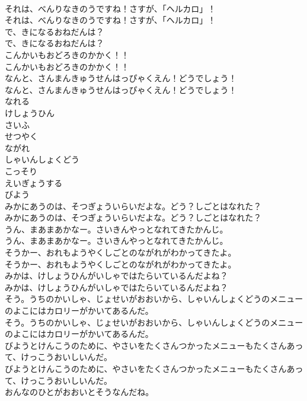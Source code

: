 \documentclass[8pt]{extreport}
\begin{document}
\begin{CJK}{UTF8}{min}
\\	それは、べんりなきのうですね！さすが、「ヘルカロ」！
\\	それは、べんりなきのうですね！さすが、「ヘルカロ」！
\\	で、きになるおねだんは？
\\	で、きになるおねだんは？
\\	こんかいもおどろきのかかく！！
\\	こんかいもおどろきのかかく！！
\\	なんと、さんまんきゅうせんはっぴゃくえん！どうでしょう！
\\	なんと、さんまんきゅうせんはっぴゃくえん！どうでしょう！
\\	なれる
\\	けしょうひん
\\	さいふ
\\	せつやく
\\	ながれ
\\	しゃいんしょくどう
\\	こっそり
\\	えいぎょうする
\\	びよう
\\	みかにあうのは、そつぎょういらいだよな。どう？しごとはなれた？
\\	みかにあうのは、そつぎょういらいだよな。どう？しごとはなれた？
\\	うん、まあまあかなー。さいきんやっとなれてきたかんじ。
\\	うん、まあまあかなー。さいきんやっとなれてきたかんじ。
\\	そうかー、おれもようやくしごとのながれがわかってきたよ。
\\	そうかー、おれもようやくしごとのながれがわかってきたよ。
\\	みかは、けしょうひんがいしゃではたらいているんだよね？
\\	みかは、けしょうひんがいしゃではたらいているんだよね？
\\	そう。うちのかいしゃ、じょせいがおおいから、しゃいんしょくどうのメニューのよこにはカロリーがかいてあるんだ。
\\	そう。うちのかいしゃ、じょせいがおおいから、しゃいんしょくどうのメニューのよこにはカロリーがかいてあるんだ。
\\	びようとけんこうのために、やさいをたくさんつかったメニューもたくさんあって、けっこうおいしいんだ。
\\	びようとけんこうのために、やさいをたくさんつかったメニューもたくさんあって、けっこうおいしいんだ。
\\	おんなのひとがおおいとそうなんだね。

\end{CJK}
\end{document}
